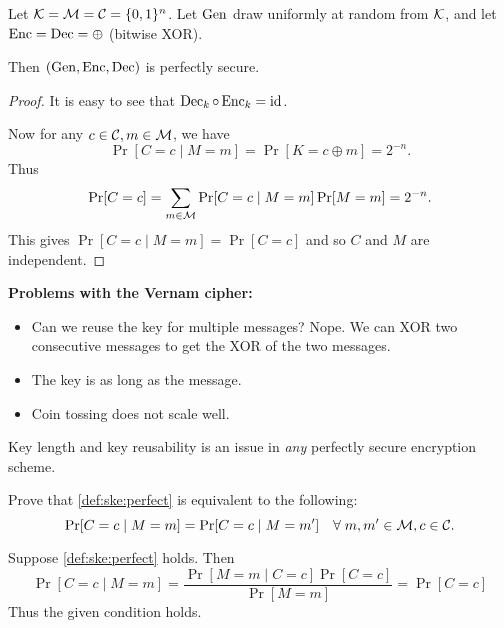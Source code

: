 \begin{theorem*} \label{thm:vernem}
    Let $\mathcal{K} = \mathcal{M} = \mathcal{C} = \{0, 1\}^n$.
    Let $\operatorname{Gen}$ draw uniformly at random from $\mathcal{K}$, and
    let $\operatorname{Enc} = \operatorname{Dec} = \oplus$ (bitwise XOR).

    Then $(\operatorname{Gen}, \operatorname{Enc}, \operatorname{Dec})$ is perfectly secure.
\end{theorem*}
\begin{proof}
    It is easy to see that $\operatorname{Dec}_k \circ \operatorname{Enc}_k = \operatorname{id}$.

    Now for any $c \in \mathcal{C}, m \in \mathcal{M}$, we have \[
        \Pr[C = c \mid M = m] = \Pr[K = c \oplus m] = 2^{-n}.
    \] Thus \[
        \Pr[C = c] = \sum_{m \in \mathcal{M}} \Pr[C = c \mid M = m] \Pr[M = m]
                   = 2^{-n}.
    \]
    This gives $\Pr[C = c \mid M = m] = \Pr[C = c]$
    and so $C$ and $M$ are independent.
\end{proof}

\noindent\textbf{Problems with the Vernam cipher:}
\begin{itemize}
    \item Can we reuse the key for multiple messages?
        Nope. We can XOR two consecutive messages to get the XOR of the
        two messages.
    \item The key is as long as the message.
    \item Coin tossing does not scale well.
\end{itemize}
\begin{fact}
    Key length and key reusability is an issue in
    \emph{any} perfectly secure encryption scheme.
\end{fact}

\begin{exercise} \label{thm:ske:perfect}
    Prove that \cref{def:ske:perfect} is equivalent to the following:
    \[
        \Pr[C = c \mid M = m] = \Pr[C = c \mid M = m'] \quad
        \forall\; m, m' \in \mathcal{M}, c \in \mathcal{C}.
    \]
\end{exercise}
\begin{solution}
    Suppose \cref{def:ske:perfect} holds.
    Then
    \[
        \Pr[C = c \mid M = m]
        = \frac{\Pr[M = m \mid C = c] \Pr[C = c]}{\Pr[M = m]}
        = \Pr[C = c]
    \] Thus the given condition holds.
\end{solution}
